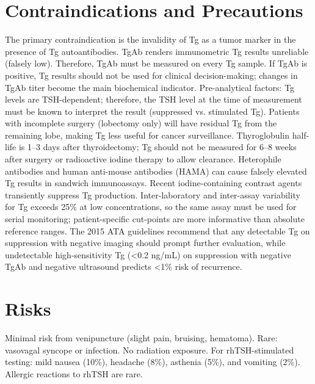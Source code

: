 \section*{Contraindications and Precautions}
The primary contraindication is the invalidity of Tg as a tumor marker in the presence of Tg autoantibodies. TgAb renders immunometric Tg results unreliable (falsely low). Therefore, TgAb must be measured on every Tg sample. If TgAb is positive, Tg results should not be used for clinical decision-making; changes in TgAb titer become the main biochemical indicator. Pre-analytical factors: Tg levels are TSH-dependent; therefore, the TSH level at the time of measurement must be known to interpret the result (suppressed vs. stimulated Tg). Patients with incomplete surgery (lobectomy only) will have residual Tg from the remaining lobe, making Tg less useful for cancer surveillance. Thyroglobulin half-life is 1--3 days after thyroidectomy; Tg should not be measured for 6--8 weeks after surgery or radioactive iodine therapy to allow clearance. Heterophile antibodies and human anti-mouse antibodies (HAMA) can cause falsely elevated Tg results in sandwich immunoassays. Recent iodine-containing contrast agents transiently suppress Tg production. Inter-laboratory and inter-assay variability for Tg exceeds 25\% at low concentrations, so the same assay must be used for serial monitoring; patient-specific cut-points are more informative than absolute reference ranges. The 2015 ATA guidelines recommend that any detectable Tg on suppression with negative imaging should prompt further evaluation, while undetectable high-sensitivity Tg (<0.2 ng/mL) on suppression with negative TgAb and negative ultrasound predicts <1\% risk of recurrence.

\section*{Risks}
Minimal risk from venipuncture (slight pain, bruising, hematoma). Rare: vasovagal syncope or infection. No radiation exposure. For rhTSH-stimulated testing: mild nausea (10\%), headache (8\%), asthenia (5\%), and vomiting (2\%). Allergic reactions to rhTSH are rare.

